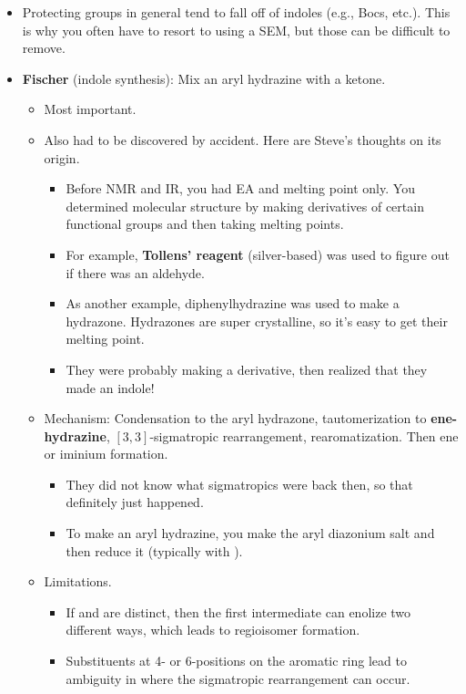 \documentclass[../notes.tex]{subfiles}
\begin{document}
\begin{itemize}
\begin{itemize}
    \end{itemize}
    \item Protecting groups in general tend to fall off of indoles (e.g., Bocs, etc.). This is why you often have to resort to using a SEM, but those can be difficult to remove.
    \item \textbf{Fischer} (indole synthesis): Mix an aryl hydrazine with a ketone.
    \begin{itemize}
        \item Most important.
        \item Also had to be discovered by accident. Here are Steve's thoughts on its origin.
        \begin{itemize}
            \item Before NMR and IR, you had EA and melting point only. You determined molecular structure by making derivatives of certain functional groups and then taking melting points.
            \item For example, \textbf{Tollens' reagent} (silver-based) was used to figure out if there was an aldehyde.
            \item As another example, diphenylhydrazine was used to make a hydrazone. Hydrazones are super crystalline, so it's easy to get their melting point.
            \item They were probably making a derivative, then realized that they made an indole!
        \end{itemize}
        \item Mechanism: Condensation to the aryl hydrazone, tautomerization to \textbf{ene-hydrazine}, $[3,3]$-sigmatropic rearrangement, rearomatization. Then ene or iminium formation.
        \begin{itemize}
            \item They did not know what sigmatropics were back then, so that definitely just happened.
            \item To make an aryl hydrazine, you make the aryl diazonium salt and then reduce it (typically with ).
        \end{itemize}
        \item Limitations.
        \begin{itemize}
            \item If  and  are distinct, then the first intermediate can enolize two different ways, which leads to regioisomer formation.
            \item Substituents at 4- or 6-positions on the aromatic ring lead to ambiguity in where the sigmatropic rearrangement can occur.

\end{itemize}
\end{itemize}
\end{itemize}
\end{document}
